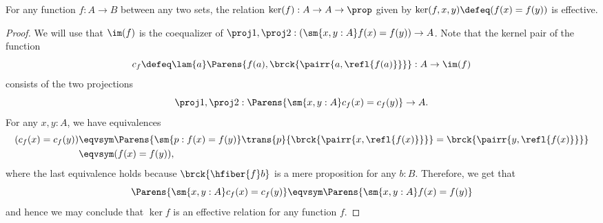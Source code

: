 %
\begin{thm}\label{prop:kernels_are_effective}
For any function $f:A\to B$ between any two sets,
the relation $\ker(f):A\to A\to\prop$ given by
$\ker(f,x,y)\defeq (f(x)= f(y))$ is effective.
\end{thm}

\begin{proof}
We will use that $\im(f)$ is the coequalizer of $\proj1,\proj2:
(\sm{x,y:A} f(x)= f(y))\to A$.
Note that the kernel pair of the function
\[c_f\defeq\lam{a} \Parens{f(a),\brck{\pairr{a,\refl{f(a)}}}}
: A \to \im(f)
\]
consists of the two projections
\begin{equation*}
\proj1,\proj2:\Parens{\sm{x,y:A} c_f(x)= c_f(y)}\to A.
\end{equation*}
For any $x,y:A$, we have equivalences
\begin{align*}
  (c_f(x)= c_f(y))
  & \eqvsym \Parens{\sm{p:f(x)= f(y)} \trans{p}{\brck{\pairr{x,\refl{f(x)}}}} =\brck{\pairr{y,\refl{f(x)}}}}\\
  & \eqvsym (f(x)= f(y)),
\end{align*}
where the last equivalence holds because
$\brck{\hfiber{f}b}$ is a mere proposition for any $b:B$.
Therefore, we get that
\begin{equation*}
\Parens{\sm{x,y:A} c_f(x)= c_f(y)}\eqvsym \Parens{\sm{x,y:A} f(x)= f(y)}
\end{equation*}
and hence we may conclude that $\ker f$ is an effective relation
for any function $f$.
\end{proof}
